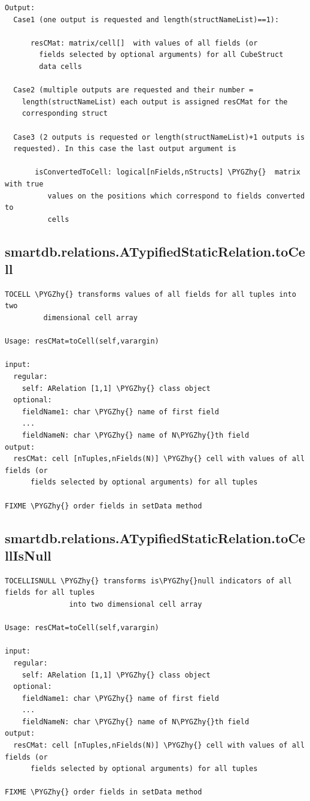 \documentclass[letterpaper,10pt,english]{sphinxmanual}
\def\PYGZhy{\char`\-}
\begin{document}
\begin{Verbatim}[commandchars=\\\{\}]
Output:
  Case1 (one output is requested and length(structNameList)==1):

      resCMat: matrix/cell[]  with values of all fields (or
        fields selected by optional arguments) for all CubeStruct
        data cells

  Case2 (multiple outputs are requested and their number =
    length(structNameList) each output is assigned resCMat for the
    corresponding struct

  Case3 (2 outputs is requested or length(structNameList)+1 outputs is
  requested). In this case the last output argument is

       isConvertedToCell: logical[nFields,nStructs] \PYGZhy{}  matrix with true
          values on the positions which correspond to fields converted to
          cells
\end{Verbatim}


\subsection{smartdb.relations.ATypifiedStaticRelation.toCell}
\label{chap_functions:smartdb-relations-atypifiedstaticrelation-tocell}
\begin{Verbatim}[commandchars=\\\{\}]
TOCELL \PYGZhy{} transforms values of all fields for all tuples into two
         dimensional cell array

Usage: resCMat=toCell(self,varargin)

input:
  regular:
    self: ARelation [1,1] \PYGZhy{} class object
  optional:
    fieldName1: char \PYGZhy{} name of first field
    ...
    fieldNameN: char \PYGZhy{} name of N\PYGZhy{}th field
output:
  resCMat: cell [nTuples,nFields(N)] \PYGZhy{} cell with values of all fields (or
      fields selected by optional arguments) for all tuples

FIXME \PYGZhy{} order fields in setData method
\end{Verbatim}


\subsection{smartdb.relations.ATypifiedStaticRelation.toCellIsNull}
\label{chap_functions:smartdb-relations-atypifiedstaticrelation-tocellisnull}
\begin{Verbatim}[commandchars=\\\{\}]
TOCELLISNULL \PYGZhy{} transforms is\PYGZhy{}null indicators of all fields for all tuples
               into two dimensional cell array

Usage: resCMat=toCell(self,varargin)

input:
  regular:
    self: ARelation [1,1] \PYGZhy{} class object
  optional:
    fieldName1: char \PYGZhy{} name of first field
    ...
    fieldNameN: char \PYGZhy{} name of N\PYGZhy{}th field
output:
  resCMat: cell [nTuples,nFields(N)] \PYGZhy{} cell with values of all fields (or
      fields selected by optional arguments) for all tuples

FIXME \PYGZhy{} order fields in setData method
\end{Verbatim}
\end{document}

